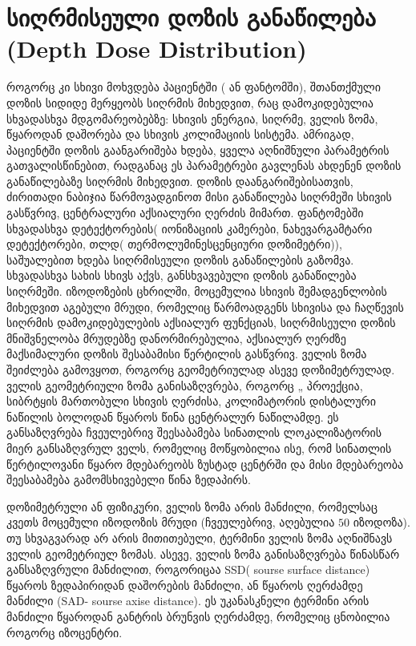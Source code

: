 \documentclass[12pt,a4paper,]{report}
\begin{document}
\section{სიღრმისეული დოზის განაწილება (Depth Dose Distribution)}
როგორც კი სხივი მოხვდება პაციენტში ( ან ფანტომში), შთანთქმული დოზის სიდიდე მერყეობს სიღრმის მიხედვით, რაც დამოკიდებულია სხვადასხვა 
მდგომარეობებზე: სხივის ენერგია, სიღრმე, ველის ზომა, წყაროდან დაშორება და სხივის კოლიმაციის სისტემა. ამრიგად, პაციენტში დოზის გაანგარიშება ხდება, ყველა აღნიშნული პარამეტრის გათვალისწინებით, რადგანაც ეს პარამეტრები გავლენას ახდენენ დოზის განაწილებაზე სიღრმის მიხედვით. დოზის დაანგარიშებისათვის, ძირითადი ნაბიჯია წარმოვადგინოთ მისი განაწილება სიღრმეში სხივის გასწვრივ, ცენტრალური აქსიალური ღერძის მიმართ. 
ფანტომებში სხვადასხვა დეტექტორების( იონიზაციის კამერები, ნახევარგამტარი დეტექტორები, თლდ( თერმოლუმინესცენციური დოზიმეტრი)),  საშუალებით ხდება სიღრმისეული დოზის განაწილების გაზომვა. სხვადასხვა სახის სხივს აქვს, განსხვავებული დოზის განაწილება სიღრმეში. იზოდოზების ცხრილში, მოცემულია სხივის შემადგენლობის მიხედვით აგებული მრუდი, რომელიც წარმოადგენს სხივისა და ჩაღწევის სიღრმის დამოკიდებულების 
აქსიალურ ფუნქციას, სიღრმისეული დოზის მნიშვნელობა მრუდებზე დანორმირებულია, აქსიალურ ღერძზე მაქსიმალური დოზის შესაბამისი წერტილის გასწვრივ. ველის ზომა შეიძლება გამოვყოთ, როგორც გეომეტრიულად ასევე დოზიმეტრულად. ველის გეომეტრიული ზომა განისაზღვრება, როგორც „ პროექცია, სიბრტყის მართობული სხივის ღერძისა, კოლიმატორის დისტალური ნაწილის ბოლოდან წყაროს წინა ცენტრალურ ნაწილამდე. ეს განსაზღვრება ჩვეულებრივ შეესაბამება სინათლის ლოკალიზატორის მიერ განსაზღვრულ ველს, რომელიც მოწყობილია ისე, რომ სინათლის წერტილოვანი წყარო მდებარეობს ზუსტად ცენტრში და მისი მდებარეობა შეესაბამება გამომსხივებელი წინა ზედაპირს. 

დოზიმეტრული ან ფიზიკური, ველის ზომა არის მანძილი, რომელსაც კვეთს მოცემული იზოდოზის მრუდი (ჩვეულებრივ, აღებულია $50$ იზოდოზა). 
თუ სხვაგვარად არ არის მითითებული, ტერმინი ველის ზომა აღნიშნავს ველის გეომეტრიულ ზომას. ასევე, ველის ზომა განისაზღვრება წინასწარ განსაზღვრული მანძილით, როგორიცაა SSD( sourse surface distance) წყაროს ზედაპირიდან დაშორების მანძილი, ან წყაროს ღერძამდე მანძილი (SAD- sourse axise distance). ეს უკანასკნელი ტერმინი არის მანძილი წყაროდან განტრის ბრუნვის ღერძამდე, რომელიც ცნობილია როგორც იზოცენტრი. 
\end{document}
